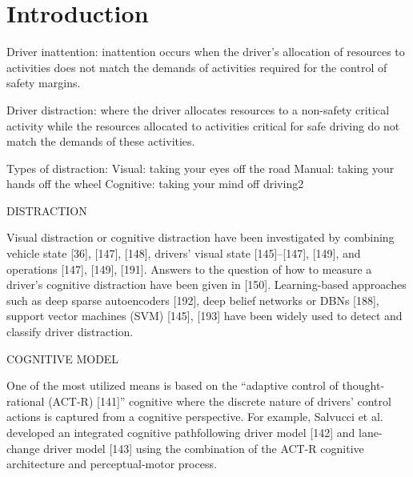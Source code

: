 \chapter{Introduction}
\label{sec:intro}




\iffalse

Driver   inattention: inattention  occurs  when  the  driver’s  allocation  of resources  to  activities  does not  match  the  demands  of  activities  required  for  the control of safety margins.

Driver distraction: where  the  driver  allocates  resources  to a  non-safety critical activity while the resources allocated to activities critical for safe driving do not match the demands of these activities.

Types of distraction:
    Visual: taking your eyes off the road
    Manual: taking your hands off the wheel
    Cognitive: taking your mind off driving2                             

DISTRACTION

Visual distraction or cognitive distraction have been investigated by combining vehicle state [36], [147], [148], drivers’ visual state [145]–[147], [149], and operations [147], [149], [191]. Answers to the question of how to measure a driver’s cognitive distraction have been given in [150]. Learning-based approaches such as deep sparse autoencoders [192], deep belief networks or DBNs [188], support vector machines (SVM) [145], [193] have been widely used to detect and classify driver distraction. \cite{shared_control}


COGNITIVE MODEL

One of the most utilized means is based on the “adaptive control of thought-rational (ACT-R) [141]”
cognitive where the discrete nature of drivers’ control actions is captured from a cognitive perspective. For example, Salvucci et al. developed an integrated cognitive pathfollowing driver model [142] and lane-change driver model [143] using the combination of the ACT-R cognitive architecture and perceptual-motor process. \cite{shared_control}



